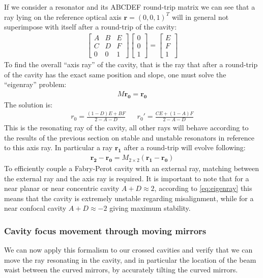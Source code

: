 If we consider a resonator and its ABCDEF round-trip matrix we can see that a ray lying on the reference optical axis $\boldsymbol{r} = (0,0,1)^T$ will in general not superimpose with itself after a round-trip of the cavity:
\begin{align}
\begin{bmatrix}
A & B & E\\
C & D & F\\
0 & 0 & 1
\end{bmatrix}
\begin{bmatrix}
0 \\
0\\
1
\end{bmatrix}
=
\begin{bmatrix}
E \\
F \\
1
\end{bmatrix}
\end{align}
To find the overall ``axis ray'' of the cavity, that is the ray that after a round-trip of the cavity has the exact same position and slope, one must solve the ``eigenray'' problem:
\begin{align}
M \boldsymbol{r_0} = \boldsymbol{r_0}
\end{align}
The solution is:
\begin{align}
r_0 = \frac{(1-D)E + BF}{2-A-D} && r_0' = \frac{CE + (1-A)F}{2-A-D}
\label{eq:eigenray}
\end{align}
This is the resonating ray of the cavity, all other rays will behave according to the results of the previous section on stable and unstable resonators in reference to this axis ray. In particular a ray $\boldsymbol{r_1}$ after a round-trip will evolve following:
\begin{align}
\boldsymbol{r_2}-\boldsymbol{r_0} = M_{2\times2} (\boldsymbol{r_1}-\boldsymbol{r_0})
\end{align}
To efficiently couple a Fabry-Perot cavity with an external ray, matching between the external ray and the axis ray is required.
It is important to note that for a near planar or near concentric cavity $A+D \approx 2$, according to \ref{eq:eigenray} this means that the cavity is extremely unstable regarding misalignment, while for a near confocal cavity $A+D \approx -2$ giving maximum stability.

\subsubsection{Cavity focus movement through moving mirrors}
We can now apply this formalism to our crossed cavities and verify that we can move the ray resonating in the cavity, and in particular the location of the beam waist between the curved mirrors, by accurately tilting the curved mirrors.

